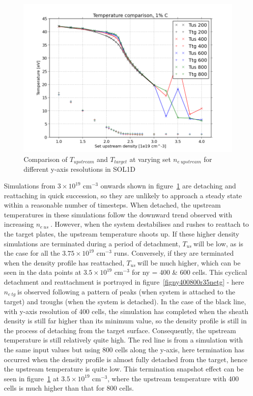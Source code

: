 \documentclass[11pt]{article}  %
\providecommand{\noNe}[1]{{${#1}\times 10^{19}$ cm$^{-3}$}} %
\providecommand{\neus}{$n_{e~us}~$} %
\providecommand{\netg}{$n_{e~tg}~$} %
\providecommand{\Tus}{$T_{us}~$} %
\begin{document}
\begin{figure}
\includegraphics[scale=0.5]{Figures/sol1d/TT_IMPCOMBO2.png}
\centering
\caption{Comparison of $T_{upstream}$ and $T_{target}$ at varying set $n_{e~upstream}$ for different y-axis resolutions in SOL1D}\label{figTT_IMPCOMBO2}
\end{figure}

Simulations from \noNe{3} onwards shown in figure~\ref{figTT_IMPCOMBO2} are detaching and reattaching in quick succession, so they are unlikely to approach a steady state within a reasonable number of timesteps. When detached, the upstream temperatures in these simulations follow the downward trend observed with increasing \neus. However, when the system destabilises and rushes to reattach to the target plates, the upstream temperature shoots up. If these higher density simulations are terminated during a period of detachment, \Tus will be low, as is the case for all the \noNe{3.75} runs. Conversely, if they are terminated when the density profile has reattached, \Tus will be much higher, which can be seen in the data points at \noNe{3.5} for ny = 400 \& 600 cells. This cyclical detachment and reattachment is portrayed in figure~\ref{figny400800r35netg} - here \netg is observed following a pattern of peaks (when system is attached to the target) and troughs (when the system is detached). In the case of the black line, with y-axis resolution of 400 cells, the simulation has completed when the sheath density is still far higher than its minimum value, so the density profile is still in the process of detaching from the target surface. Consequently, the upstream temperature is still relatively quite high. The red line is from a simulation with the same input values but using 800 cells along the y-axis, here termination has occurred when the density profile is almost fully detached from the target, hence the upstream temperature is quite low. This termination snapshot effect can be seen in figure~\ref{figTT_IMPCOMBO2} at \noNe{3.5}, where the upstream temperature with 400 cells is much higher than that for 800 cells.
\end{document}
